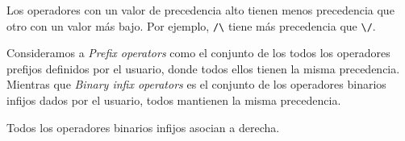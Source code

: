 \documentclass[a4paper,11pt]{article}
\theoremstyle{definition}
\theoremstyle{remark}
\begin{document}
Los operadores con un valor de precedencia alto tienen menos precedencia que otro con un valor más bajo.
Por ejemplo, \texttt{/\textbackslash} tiene más precedencia que \texttt{\textbackslash/}.

Consideramos a \textit{Prefix operators} como el conjunto de los todos los operadores prefijos definidos por el usuario,
donde todos ellos tienen la misma precedencia.
Mientras que \textit{Binary infix operators} es el conjunto de los operadores binarios infijos dados por el usuario,
todos mantienen la misma precedencia.

Todos los operadores binarios infijos asocian a derecha.


  


\end{document}
